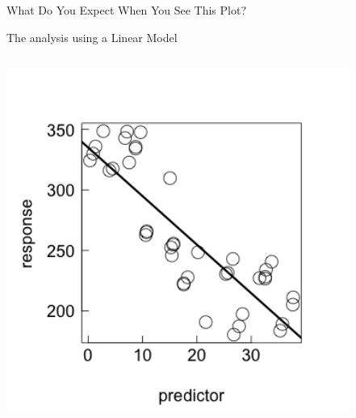 \documentclass{beamer}
\begin{document}
\begin{frame}{What Do You Expect When You See This Plot?}

The analysis using a Linear Model

\begin{columns}[onlytextwidth] %
    \begin{column}{0.5\textwidth}
    \includegraphics[width=0.999\textwidth]{lectures/day_1_intro_to_mems/figures/unnamed-chunk-11-1.png} %
  \end{column}
    \hspace{0.0\textwidth} %
\begin{column}{0.6\textwidth}
    \scalebox{0.6}{
      
      }
    \end{column}
  \end{columns}

\end{frame}
\end{document}
